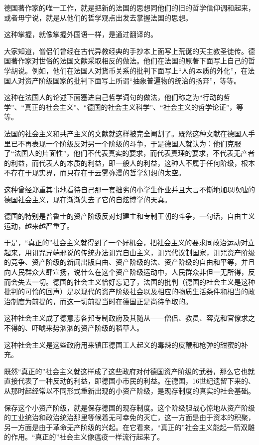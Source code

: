 \documentclass[UTF8,zihao=-4,a4paper]{ctexart}
\begin{document}
德国著作家的唯一工作，就是把新的法国的思想同他们的旧的哲学信仰调和起来，或者毋宁说，就是从他们的哲学观点出发去掌握法国的思想。\par
这种掌握，就像掌握外国语一样，是通过翻译的。\par
大家知道，僧侣们曾经在古代异教经典的手抄本上面写上荒诞的天主教圣徒传。德国著作家对世俗的法国文献采取相反的做法。他们在法国的原著下面写上自己的哲学胡说。例如，他们在法国人对货币关系的批判下面写上“人的本质的外化”，在法国人对资产阶级国家的批判下面写上所谓“抽象普遍物的统治的扬弃”，等等。\par
这种在法国人的论述下面塞进自己哲学词句的做法，他们称之为“行动的哲学”、“真正的社会主义”、“德国的社会主义科学”、“社会主义的哲学论证”，等等。\par
法国的社会主义和共产主义的文献就这样被完全阉割了。既然这种文献在德国人手里已不再表现一个阶级反对另一个阶级的斗争，于是德国人就认为：他们克服了“法国人的片面性”，他们不代表真实的要求，而代表真理的要求，不代表无产者的利益，而代表人的本质的利益，即一般人的利益，这种人不属于任何阶级，根本不存在于现实界，而只存在于云雾弥漫的哲学幻想的太空。\par
这种曾经郑重其事地看待自己那一套拙劣的小学生作业并且大言不惭地加以吹嘘的德国社会主义，现在渐渐失去了它的自炫博学的天真。\par
德国的特别是普鲁士的资产阶级反对封建主和专制王朝的斗争，一句话，自由主义运动，越来越严重了。\par
于是，“真正的”社会主义就得到了一个好机会，把社会主义的要求同政治运动对立起来，用诅咒异端邪说的传统办法诅咒自由主义，诅咒代议制国家，诅咒资产阶级的竞争、资产阶级的新闻出版自由、资产阶级的法、资产阶级的自由和平等，并且向人民群众大肆宣扬，说什么在这个资产阶级运动中，人民群众非但一无所得，反而会失去一切。德国的社会主义恰好忘记了，法国的批判（德国的社会主义是这种批判的可怜的回声）是以现代的资产阶级社会以及相应的物质生活条件和相当的政治制度为前提的，而这一切前提当时在德国正是尚待争取的。\par
这种社会主义成了德意志各邦专制政府及其随从——僧侣、教员、容克和官僚求之不得的、吓唬来势汹汹的资产阶级的稻草人。\par
这种社会主义是这些政府用来镇压德国工人起义的毒辣的皮鞭和枪弹的甜蜜的补充。\par
既然“真正的”社会主义就这样成了这些政府对付德国资产阶级的武器，那么它也就直接代表了一种反动的利益，即德国小市民的利益。在德国，16世纪遗留下来的、从那时起经常以不同形式重新出现的小资产阶级，是现存制度的真实的社会基础。\par
保存这个小资产阶级，就是保存德国的现存制度。这个阶级胆战心惊地从资产阶级的工业统治和政治统治那里等候着无可幸免的灭亡，这一方面是由于资本的积聚，另一方面是由于革命无产阶级的兴起。在它看来，“真正的”社会主义能起一箭双雕的作用。“真正的”社会主义像瘟疫一样流行起来了。\par
\end{document}
